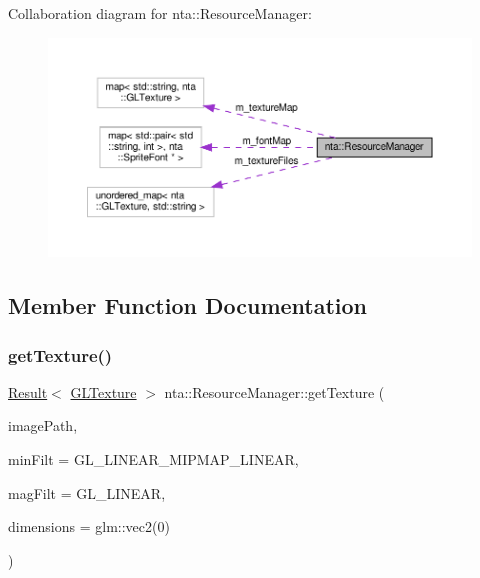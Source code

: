 Collaboration diagram for nta\+:\+:Resource\+Manager\+:\nopagebreak
\begin{figure}[H]
\begin{center}
\leavevmode
\includegraphics[width=350pt]{d2/d39/classnta_1_1ResourceManager__coll__graph}
\end{center}
\end{figure}


\subsection{Member Function Documentation}
\mbox{\label{classnta_1_1ResourceManager_a60911bfeef0df3802c6ef03cc10fb5c1}} 
\subsubsection{\texorpdfstring{get\+Texture()}{getTexture()}}
{\footnotesize\ttfamily \hyperlink{classnta_1_1Result}{Result}$<$ \hyperlink{structnta_1_1GLTexture}{G\+L\+Texture} $>$ nta\+::\+Resource\+Manager\+::get\+Texture (\begin{DoxyParamCaption}\item[{crstring}]{image\+Path,  }\item[{G\+Lint}]{min\+Filt = {\ttfamily GL\+\_\+LINEAR\+\_\+MIPMAP\+\_\+LINEAR},  }\item[{G\+Lint}]{mag\+Filt = {\ttfamily GL\+\_\+LINEAR},  }\item[{crvec2}]{dimensions = {\ttfamily glm\+:\+:vec2(0)} }\end{DoxyParamCaption})\hspace{0.3cm}{\ttfamily [static]}}

